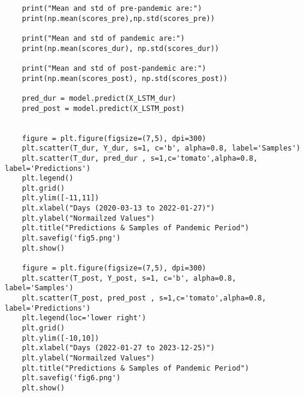 \begin{lstlisting}
    print("Mean and std of pre-pandemic are:")
    print(np.mean(scores_pre),np.std(scores_pre))
    
    print("Mean and std of pandemic are:")
    print(np.mean(scores_dur), np.std(scores_dur))
    
    print("Mean and std of post-pandemic are:")
    print(np.mean(scores_post), np.std(scores_post))
    
    pred_dur = model.predict(X_LSTM_dur)
    pred_post = model.predict(X_LSTM_post)
    
    
    figure = plt.figure(figsize=(7,5), dpi=300)
    plt.scatter(T_dur, Y_dur, s=1, c='b', alpha=0.8, label='Samples')
    plt.scatter(T_dur, pred_dur , s=1,c='tomato',alpha=0.8, label='Predictions')
    plt.legend()
    plt.grid()
    plt.ylim([-11,11])
    plt.xlabel("Days (2020-03-13 to 2022-01-27)")
    plt.ylabel("Normailzed Values")
    plt.title("Predictions & Samples of Pandemic Period")
    plt.savefig('fig5.png')
    plt.show()
    
    figure = plt.figure(figsize=(7,5), dpi=300)
    plt.scatter(T_post, Y_post, s=1, c='b', alpha=0.8, label='Samples')
    plt.scatter(T_post, pred_post , s=1,c='tomato',alpha=0.8, label='Predictions')
    plt.legend(loc='lower right')
    plt.grid()
    plt.ylim([-10,10])
    plt.xlabel("Days (2022-01-27 to 2023-12-25)")
    plt.ylabel("Normailzed Values")
    plt.title("Predictions & Samples of Pandemic Period")
    plt.savefig('fig6.png')
    plt.show()
\end{lstlisting}